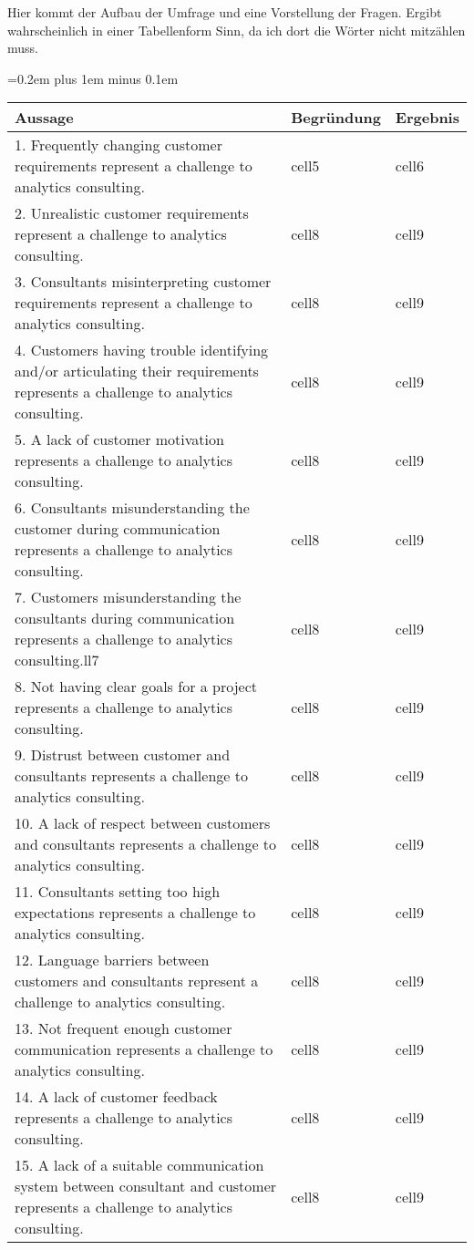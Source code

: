 \documentclass[../main.tex]{subfiles}
\begin{document}
Hier kommt der Aufbau der Umfrage und eine Vorstellung der Fragen. Ergibt wahrscheinlich in einer Tabellenform Sinn, da ich dort die Wörter nicht mitzählen muss.
{
\spaceskip=0.2em plus 1em minus 0.1em
\small
\begin{xltabular}[h]{\linewidth}{| X | X | m{1.8cm} |}
    \hline
    Aussage & Begründung & Ergebnis \\
    \hline
    \hline
    \label{q:1}1. Frequently changing customer requirements represent a challenge to analytics consulting. & cell5 & cell6 \\
    \hline  
    \label{q:2}2. Unrealistic customer requirements represent a challenge to analytics consulting. & cell8 & cell9 \\
    \hline
    \label{q:3}3. Consultants misinterpreting customer requirements represent a challenge to analytics consulting. & cell8 & cell9 \\
    \hline
    \label{q:4}4. Customers having trouble identifying and/or articulating their requirements represents a challenge to analytics consulting.  & cell8 & cell9 \\
    \hline
    \label{q:5}5. A lack of customer motivation represents a challenge to analytics consulting. & cell8 & cell9 \\
    \hline
    \label{q:6}6. Consultants misunderstanding the customer during communication represents a challenge to analytics consulting. & cell8 & cell9 \\
    \hline
    \label{q:7}7.  Customers misunderstanding the consultants during communication represents a challenge to analytics consulting.ll7 & cell8 & cell9 \\
    \hline
    \label{q:8}8. Not having clear goals for a project represents a challenge to analytics consulting. & cell8 & cell9 \\
    \hline
    \label{q:9}9. Distrust between customer and consultants represents a challenge to analytics consulting. & cell8 & cell9 \\
    \hline
    \label{q:10}10. A lack of respect between customers and consultants represents a challenge to analytics consulting. & cell8 & cell9 \\
    \hline
    \label{q:11}11. Consultants setting too high expectations represents a challenge to analytics consulting. & cell8 & cell9 \\
    \hline
    \label{q:12}12. Language barriers between customers and consultants represent a challenge to analytics consulting. & cell8 & cell9 \\
    \hline
    \label{q:13}13. Not frequent enough customer communication represents a challenge to analytics consulting. & cell8 & cell9 \\
    \hline
    \label{q:14}14. A lack of customer feedback represents a challenge to analytics consulting. & cell8 & cell9 \\
    \hline
    \label{q:15}15. A lack of a suitable communication system between consultant and customer represents a challenge to analytics consulting. & cell8 & cell9 \\
    \hline
\end{xltabular}
}
\end{document}

